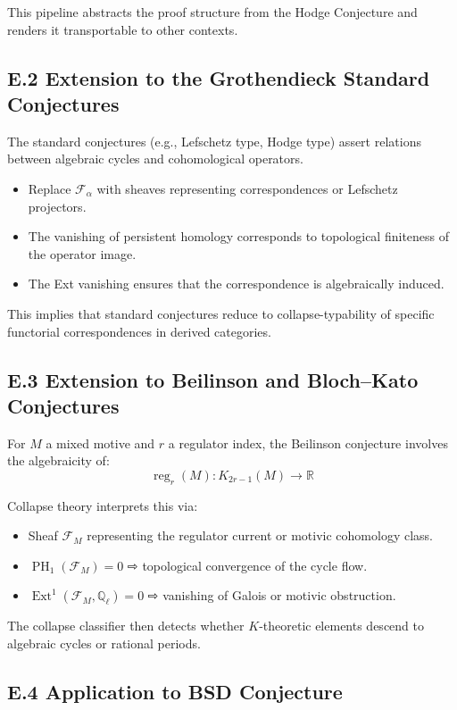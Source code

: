 \documentclass[11pt]{article}
\DeclareMathOperator{\Ext}{Ext}
\DeclareMathOperator{\PH}{PH}
\begin{document}
This pipeline abstracts the proof structure from the Hodge Conjecture and renders it transportable to other contexts.

\subsection*{E.2 Extension to the Grothendieck Standard Conjectures}

The standard conjectures (e.g., Lefschetz type, Hodge type) assert relations between algebraic cycles and cohomological operators.

\begin{itemize}
  \item Replace $\mathcal{F}_\alpha$ with sheaves representing correspondences or Lefschetz projectors.
  \item The vanishing of persistent homology corresponds to topological finiteness of the operator image.
  \item The Ext vanishing ensures that the correspondence is algebraically induced.
\end{itemize}

This implies that standard conjectures reduce to collapse-typability of specific functorial correspondences in derived categories.

\subsection*{E.3 Extension to Beilinson and Bloch–Kato Conjectures}

For $M$ a mixed motive and $r$ a regulator index, the Beilinson conjecture involves the algebraicity of:
\[
\operatorname{reg}_r(M): K_{2r - 1}(M) \to \mathbb{R}
\]

Collapse theory interprets this via:

\begin{itemize}
  \item Sheaf $\mathcal{F}_M$ representing the regulator current or motivic cohomology class.
  \item $\PH_1(\mathcal{F}_M) = 0$ ⇨ topological convergence of the cycle flow.
  \item $\Ext^1(\mathcal{F}_M, \mathbb{Q}_\ell) = 0$ ⇨ vanishing of Galois or motivic obstruction.
\end{itemize}

The collapse classifier then detects whether $K$-theoretic elements descend to algebraic cycles or rational periods.

\subsection*{E.4 Application to BSD Conjecture}
\end{document}
